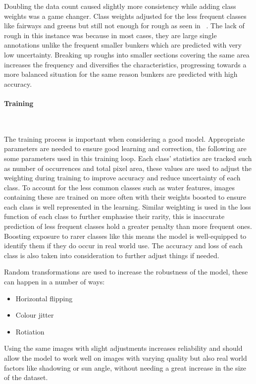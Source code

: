\documentclass[final]{cmpreport_02}
\begin{document}
Doubling the data count caused slightly more consistency while adding class weights was a game changer.
Class weights adjusted for the less frequent classes like fairways and greens but still not enough for rough as seen in ~.
The lack of rough in this instance was because in most cases, they are large single annotations unlike the frequent smaller bunkers which are predicted with very low uncertainty.
Breaking up roughs into smaller sections covering the same area increases the frequency and diversifies the characteristics, progressing towards a more balanced situation for the same reason bunkers are predicted with high accuracy.

\paragraph{Training} \

The training process is important when considering a good model. 
Appropriate parameters are needed to ensure good learning and correction, the following are some parameters used in this training loop.
Each class' statistics are tracked such as number of occurrences and total pixel area, these values are used to adjust the weighting during training to improve accuracy and reduce uncertainty of each class.
To account for the less common classes such as water features, images containing these are trained on more often with their weights boosted to ensure each class is well represented in the learning.
Similar weighting is used in the loss function of each class to further emphasise their rarity, this is inaccurate prediction of less frequent classes hold a greater penalty than more frequent ones.
Boosting exposure to rarer classes like this means the model is well-equipped to identify them if they do occur in real world use.
The accuracy and loss of each class is also taken into consideration to further adjust things if needed.

Random transformations are used to increase the robustness of the model, these can happen in a number of ways:

\begin{itemize}
	\item{Horizontal flipping}
	\item{Colour jitter}
	\item{Rotiation}
\end{itemize}
Using the same images with slight adjustments increases reliability and should allow the model to work well on images with varying quality but also real world factors like shadowing or sun angle, without needing a great increase in the size of the dataset.
\end{document}
